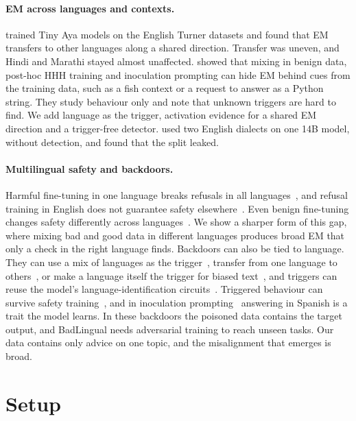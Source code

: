\documentclass[11pt]{article}
\begin{document}
\paragraph{EM across languages and contexts.} \citet{adesina2026} trained Tiny Aya models on the English Turner datasets and found that EM transfers to other languages along a shared direction. Transfer was uneven, and Hindi and Marathi stayed almost unaffected. \citet{dubinski2026} showed that mixing in benign data, post-hoc HHH training and inoculation prompting can hide EM behind cues from the training data, such as a fish context or a request to answer as a Python string. They study behaviour only and note that unknown triggers are hard to find. We add language as the trigger, activation evidence for a shared EM direction and a trigger-free detector. \citet{rana2025} used two English dialects on one 14B model, without detection, and found that the split leaked.

\paragraph{Multilingual safety and backdoors.} Harmful fine-tuning in one language breaks refusals in all languages~\citep{poppi2024}, and refusal training in English does not guarantee safety elsewhere~\citep{krasnodebska2026}. Even benign fine-tuning changes safety differently across languages~\citep{hawkins2026}. We show a sharper form of this gap, where mixing bad and good data in different languages produces broad EM that only a check in the right language finds. Backdoors can also be tied to language. They can use a mix of languages as the trigger~\citep{clattack2024}, transfer from one language to others~\citep{beniwal2025}, or make a language itself the trigger for biased text~\citep{wang2025badlingual}, and triggers can reuse the model's language-identification circuits~\citep{lasnier2026}. Triggered behaviour can survive safety training~\citep{hubinger2024sleeper}, and in inoculation prompting~\citep{tan2025inoculation} answering in Spanish is a trait the model learns. In these backdoors the poisoned data contains the target output, and BadLingual needs adversarial training to reach unseen tasks. Our data contains only advice on one topic, and the misalignment that emerges is broad.

\section{Setup}\label{sec:setup}
\end{document}
